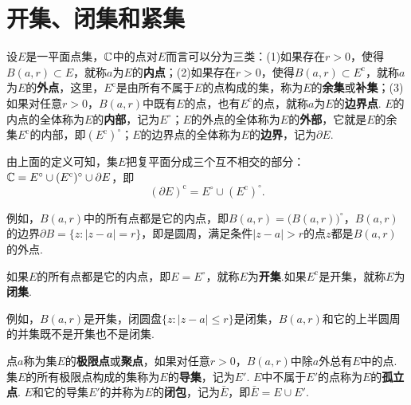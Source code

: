 \section{开集、闭集和紧集\label{sec1.5}}
设$E$是一平面点集，$\mathbb C$中的点对$E$而言可以分为三类：(1)如果存在$r>0$，使得$B(a,r)\subset E$，就称$a$为$E$的\textbf{内点}；(2)如果存在$r>0$，使得$B(a,r)\subset E^{\mathrm c}$，就称$a$为$E$的\textbf{外点}，这里，$E^{\mathrm c}$是由所有不属于$E$的点构成的集，称为$E$的\textbf{余集}或\textbf{补集}；(3)如果对任意$r>
0$，$B(a,r)$中既有$E$的点，也有$E^{\mathrm c}$的点，就称$a$为$E$的\textbf{边界点}. $E$的内点的全体称为$E$的\textbf{内部}，记为$E^\circ$；$E$的外点的全体称为$E$的\textbf{外部}，它就是$E$的余集$E^{\mathrm c}$的内部，即$(E^{\mathrm c})^\circ$；$E$的边界点的全体称为$E$的\textbf{边界}，记为$\partial E$.

由上面的定义可知，集$E$把复平面分成三个互不相交的部分：$\mathbb C=E^\circ\cup(E^{\mathrm c})^\circ\cup\partial E$，即
\begin{equation}\label{eq1.5.1}
  (\partial E)^{\mathrm c} = E^\circ\cup(E^{\mathrm c})^\circ.
\end{equation}

例如，$B(a,r)$中的所有点都是它的内点，即$B(a,r)=\big(B(a,r)\bigr)^\circ$，$B(a,r)$的边界$\partial B=\{z:|z-a|=r\}$，即是圆周，满足条件$|z-a|>r$的点$z$都是$B(a,r)$的外点.

如果$E$的所有点都是它的内点，即$E=E^\circ$，就称$E$为\textbf{开集}.如果$E^{\mathrm c}$是开集，就称$E$为\textbf{闭集}.

例如，$B(a,r)$是开集，闭圆盘$\{z:|z-a|\le r\}$是闭集，$B(a,r)$和它的上半圆周的并集既不是开集也不是闭集.

点$a$称为集$E$的\textbf{极限点}或\textbf{聚点}，如果对任意$r>0$，$B(a,r)$中除$a$外总有$E$中的点. 集$E$的所有极限点构成的集称为$E$的\textbf{导集}，记为$E'$. $E$中不属于$E'$的点称为$E$的\textbf{孤立点}. $E$和它的导集$E'$的并称为$E$的\textbf{闭包}，记为$\bar E$，即$\bar E=E\cup E'$.

